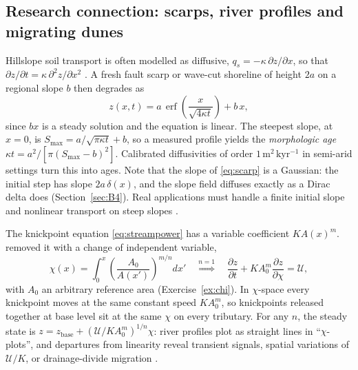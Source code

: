 \documentclass[11pt,letterpaper]{article}
\numberwithin{equation}{section}
\newcommand{\pd}[2]{\frac{\partial #1}{\partial #2}}
\newcommand{\units}[1]{\,\mathrm{#1}}
\DeclareMathOperator{\erf}{erf}
\newcommand{\Up}{\mathcal{U}}
\begin{document}
\subsection{Research connection: scarps, river profiles and migrating dunes}
\begin{research}
Hillslope soil transport is often modelled as diffusive, $q_s=-\kappa\,\partial z/\partial x$, so that
$\partial z/\partial t=\kappa\,\partial^2 z/\partial x^2$ \citep{culling1960}. A fresh fault scarp or wave-cut shoreline of
height $2a$ on a regional slope $b$ then degrades as \citep{nash1980,hanks1984}
\begin{equation}\label{eq:scarp}
z(x,t)=a\,\erf\!\left(\frac{x}{\sqrt{4\kappa t}}\right)+b\,x ,
\end{equation}
since $bx$ is a steady solution and the equation is linear. The steepest slope, at $x=0$, is
$S_{\max}=a/\sqrt{\pi\kappa t}+b$, so a measured profile yields the \emph{morphologic age}
$\kappa t=a^2/[\pi(S_{\max}-b)^2]$. Calibrated diffusivities of order $1\units{m^2\,kyr^{-1}}$ in semi-arid settings turn
this into ages. Note that the slope of \eqref{eq:scarp} is a Gaussian: the initial step has slope $2a\,\delta(x)$, and
the slope field diffuses exactly as a Dirac delta does (Section~\ref{sec:B4}). Real applications must handle a
finite initial slope and nonlinear transport on steep slopes \citep{roering1999}.
\end{research}

\begin{research}
The knickpoint equation \eqref{eq:streampower} has a variable coefficient $KA(x)^m$. \citet{perron2013} removed it with
a change of independent variable,
\begin{equation}\label{eq:chi}
\chi(x)=\int_0^{x}\left(\frac{A_0}{A(x')}\right)^{m/n}dx'\quad\overset{n=1}{\Longrightarrow}\quad
\pd{z}{t}+KA_0^{m}\pd{z}{\chi}=\Up ,
\end{equation}
with $A_0$ an arbitrary reference area (Exercise~\ref{ex:chi}). In $\chi$-space every knickpoint moves at the same
constant speed $KA_0^m$, so knickpoints released together at base level sit at the same $\chi$ on every tributary. For any $n$,
the steady state is $z=z_{\mathrm{base}}+(\Up/KA_0^m)^{1/n}\chi$: river profiles plot as straight lines in ``$\chi$-plots'', and
departures from linearity reveal transient signals, spatial variations of $\Up/K$, or drainage-divide migration
\citep{willett2014}.
\end{research}
\end{document}

